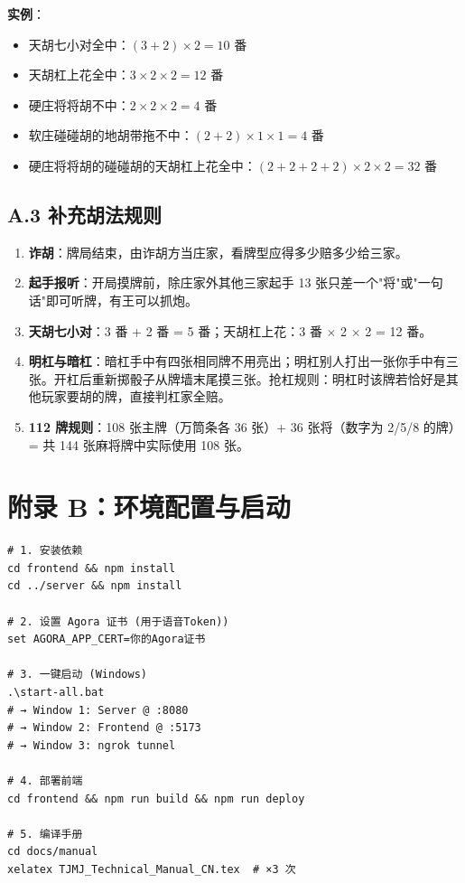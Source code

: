 \documentclass[11pt,a4paper]{article}
\begin{document}
\textbf{实例}：
\begin{itemize}[nosep]
  \item 天胡七小对全中：$(3+2)\times 2 = 10$ 番
  \item 天胡杠上花全中：$3\times 2\times 2 = 12$ 番
  \item 硬庄将将胡不中：$2\times 2\times 2 = 4$ 番
  \item 软庄碰碰胡的地胡带拖不中：$(2+2)\times 1\times 1 = 4$ 番
  \item 硬庄将将胡的碰碰胡的天胡杠上花全中：$(2+2+2+2)\times 2\times 2 = 32$ 番
\end{itemize}

\subsection*{A.3 补充胡法规则}

\begin{enumerate}
  \item \textbf{诈胡}：牌局结束，由诈胡方当庄家，看牌型应得多少赔多少给三家。
  \item \textbf{起手报听}：开局摸牌前，除庄家外其他三家起手 13 张只差一个"将"或"一句话"即可听牌，有王可以抓炮。
  \item \textbf{天胡七小对}：3 番 + 2 番 = 5 番；天胡杠上花：3 番 $\times$ 2 $\times$ 2 = 12 番。
  \item \textbf{明杠与暗杠}：暗杠手中有四张相同牌不用亮出；明杠别人打出一张你手中有三张。开杠后重新掷骰子从牌墙末尾摸三张。抢杠规则：明杠时该牌若恰好是其他玩家要胡的牌，直接判杠家全赔。
  \item \textbf{112 牌规则}：108 张主牌（万筒条各 36 张）+ 36 张将（数字为 2/5/8 的牌）= 共 144 张麻将牌中实际使用 108 张。
\end{enumerate}

\newpage
\section*{附录 B：环境配置与启动}

\begin{verbatim}
# 1. 安装依赖
cd frontend && npm install
cd ../server && npm install

# 2. 设置 Agora 证书 (用于语音Token))
set AGORA_APP_CERT=你的Agora证书

# 3. 一键启动 (Windows)
.\start-all.bat
# → Window 1: Server @ :8080
# → Window 2: Frontend @ :5173
# → Window 3: ngrok tunnel

# 4. 部署前端
cd frontend && npm run build && npm run deploy

# 5. 编译手册
cd docs/manual
xelatex TJMJ_Technical_Manual_CN.tex  # ×3 次
\end{verbatim}
\end{document}
